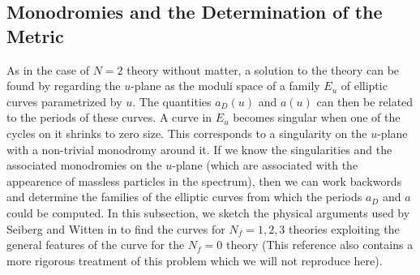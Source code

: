 \subsection{Monodromies and the Determination of the Metric}

As in the case of $N=2$ theory without matter, a solution to the
theory can be found by regarding the $u$-plane as the moduli space of
a family $E_u$ of elliptic curves parametrized by $u$. The quantities
$a_D(u)$ and $a(u)$ can then be related to the periods of these
curves. A curve in $E_u$ becomes singular when one of the cycles on it
shrinks to zero size. This corresponds to a singularity on the
$u$-plane with a non-trivial monodromy around it. If we know the
singularities and the associated monodromies on the $u$-plane (which
are associated with the appearence of massless particles in the
spectrum), then we can work backwords and determine the families of the
elliptic curves from which the periods $a_D$ and $a$ could be
computed. In this subsection, we sketch the physical arguments
used by Seiberg and Witten in \cite{SW2} to find the curves for
$N_f=1,2,3$ theories exploiting the general features of the curve for
the $N_f=0$ theory (This reference also contains a more rigorous
treatment of this problem which we will not reproduce here).

